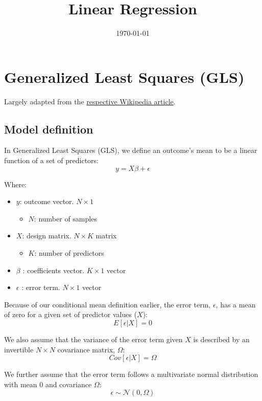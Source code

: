 \documentclass[12pt]{article}
\title{Linear Regression}
\date{\today}
\begin{document}
\maketitle

\section{Generalized Least Squares (GLS)}

Largely adapted from the \href{https://en.wikipedia.org/wiki/Generalized_least_squares}{respective Wikipedia article}.

\subsection{Model definition}

In Generalized Least Squares (GLS), we define an outcome's mean to be a linear function of a set of predictors:
$$ y = X \beta + \epsilon $$

Where:

\begin{itemize}
    \item $y$: outcome vector. $N \times 1$
    \begin{itemize}
        \item $N$: number of samples
    \end{itemize}
    \item $X$: design matrix. $N \times K$ matrix
    \begin{itemize}
        \item $K$: number of predictors
    \end{itemize}
    \item $\beta$ : coefficients vector. $K \times 1$ vector
    \item $\epsilon$ : error term. $N \times 1$ vector
\end{itemize}

Because of our conditional mean definition earlier, the error term, $\epsilon$, has a mean of zero for a given set of predictor values ($X$):
$$ E [\epsilon | X ] = 0 $$

We also assume that the variance of the error term given $X$ is described by an invertible $N \times N$ covariance matrix, $\Omega$:
$$ Cov[ \epsilon | X ] = \Omega $$

We further assume that the error term follows a multivariate normal distribution with mean 0 and covariance $\Omega$:
$$ \epsilon \sim \mathcal{N} (0, \Omega) $$
\end{document}
